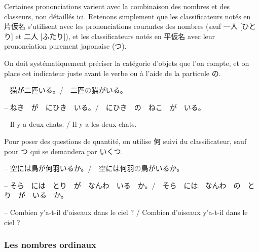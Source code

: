     Certaines prononciations varient avec la combinaison des nombres et des classeurs, non détaillés ici. Retenons simplement que les classificateurs notés en 片仮名 s'utilisent avec les prononciations courantes des nombres (sauf 一人 [ひとり]  et 二人 [ふたり]), et les classificateurs notés en 平仮名 avec leur prononciation purement japonaise (つ).

    On doit systématiquement préciser la catégorie d'objets que l'on compte, et on place cet indicateur juste avant le verbe ou à l'aide de la particule の.

    \begin{tcolorbox}
        -- 猫が\textcolor{couleurmatiere}{二匹}いる。/　\textcolor{couleurmatiere}{二匹}\textcolor{gray}{の}猫がいる。

        -- ねき　が　にひき　いる。/　にひき　の　ねこ　が　いる。

        -- Il y a deux chats. / Il y a les deux chats.
    \end{tcolorbox}

    Pour poser des questions de quantité, on utilise 何 suivi du classificateur, sauf pour つ qui se demandera par いくつ.

    \begin{tcolorbox}
        -- 空には鳥が\textcolor{couleurmatiere}{何羽}いるか。/　空には\textcolor{couleurmatiere}{何羽}\textcolor{gray}{の}鳥がいるか。

        -- そら　には　とり　が　なんわ　いる　か。/　そら　には　なんわ　の　とり　が　いる　か。

        -- Combien y'a-t-il d'oiseaux dans le ciel ? / Combien d'oiseaux y'a-t-il dans le ciel ?
    \end{tcolorbox}

        \subsubsection{Les nombres ordinaux}


